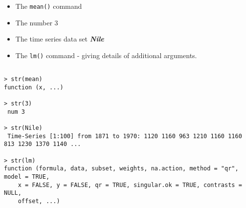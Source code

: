 \documentclass[a4paper,12pt]{article}
\begin{document}
\begin{itemize}
\item The \texttt{mean()} command
\item The number 3
\item The time series data set \textit{\textbf{Nile}}
\item The \texttt{lm()} command - giving details of additional arguments.
\end{itemize}
\begin{verbatim}

> str(mean)
function (x, ...)  

> str(3)
 num 3

> str(Nile)
 Time-Series [1:100] from 1871 to 1970: 1120 1160 963 1210 1160 1160 813 1230 1370 1140 ...

> str(lm)
function (formula, data, subset, weights, na.action, method = "qr", model = TRUE, 
    x = FALSE, y = FALSE, qr = TRUE, singular.ok = TRUE, contrasts = NULL, 
    offset, ...) 

\end{verbatim}
\end{document}
